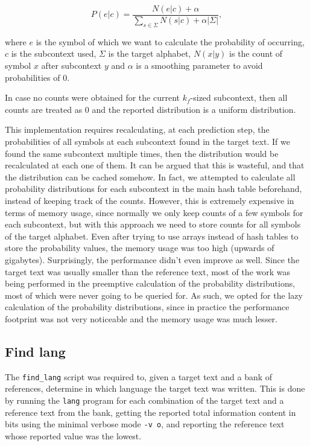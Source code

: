 \documentclass{article}
\begin{document}
$$
P(e|c) = \frac{N(e|c) + \alpha}{\sum_{s \in \Sigma}{N(s|c)} + \alpha |\Sigma|},
$$

where $e$ is the symbol of which we want to calculate the probability of occurring, $c$ is the subcontext used, $\Sigma$ is the target alphabet, $N(x|y)$ is the count of symbol $x$ after subcontext $y$ and $\alpha$ is a smoothing parameter to avoid probabilities of 0.

In case no counts were obtained for the current $k_f$-sized subcontext, then all counts are treated as 0 and the reported distribution is a uniform distribution.

This implementation requires recalculating, at each prediction step, the probabilities of all symbols at each subcontext found in the target text.
If we found the same subcontext multiple times, then the distribution would be recalculated at each one of them.
It can be argued that this is wasteful, and that the distribution can be cached somehow.
In fact, we attempted to calculate all probability distributions for each subcontext in the main hash table beforehand, instead of keeping track of the counts.
However, this is extremely expensive in terms of memory usage, since normally we only keep counts of a few symbols for each subcontext, but with this approach we need to store counts for all symbols of the target alphabet.
Even after trying to use arrays instead of hash tables to store the probability values, the memory usage was too high (upwards of gigabytes).
Surprisingly, the performance didn't even improve as well.
Since the target text was usually smaller than the reference text, most of the work was being performed in the preemptive calculation of the probability distributions, most of which were never going to be queried for.
As such, we opted for the lazy calculation of the probability distributions, since in practice the performance footprint was not very noticeable and the memory usage was much lesser.

\subsection{Find lang}
\label{subsec:methodology_find_lang}

The \texttt{find\_lang} script was required to, given a target text and a bank of references, determine in which language the target text was written.
This is done by running the \texttt{lang} program for each combination of the target text and a reference text from the bank, getting the reported total information content in bits using the minimal verbose mode \texttt{-v o}, and reporting the reference text whose reported value was the lowest.
\end{document}
